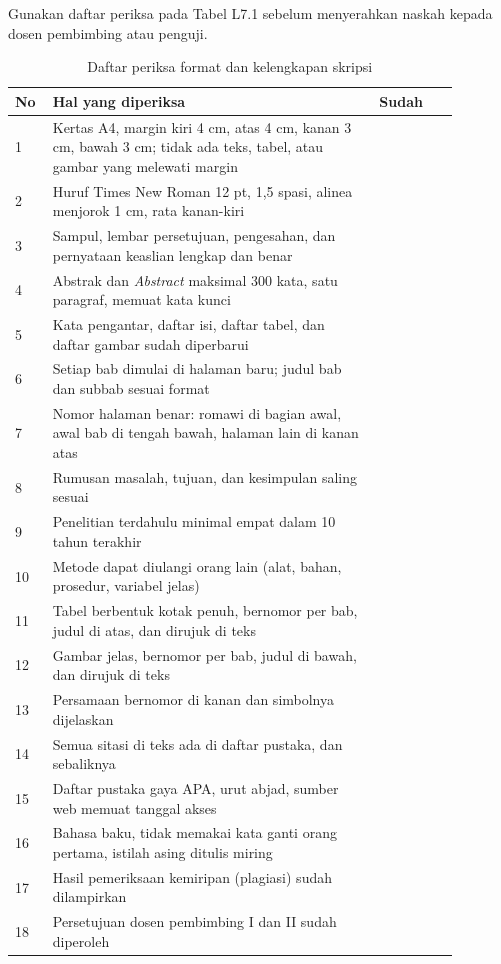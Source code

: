 Gunakan daftar periksa pada Tabel L7.1 sebelum menyerahkan naskah kepada dosen pembimbing atau penguji.

\begin{singlespace}
\begin{longtable}{|p{0.06\linewidth}|p{0.66\linewidth}|p{0.16\linewidth}|}
\caption{Daftar periksa format dan kelengkapan skripsi}\\
\hline
\textbf{No} & \textbf{Hal yang diperiksa} & \textbf{Sudah} \\
\hline
1 & Kertas A4, margin kiri 4 cm, atas 4 cm, kanan 3 cm, bawah 3 cm; tidak ada teks, tabel, atau gambar yang melewati margin & \\
\hline
2 & Huruf Times New Roman 12 pt, 1,5 spasi, alinea menjorok 1 cm, rata kanan-kiri & \\
\hline
3 & Sampul, lembar persetujuan, pengesahan, dan pernyataan keaslian lengkap dan benar & \\
\hline
4 & Abstrak dan \textit{Abstract} maksimal 300 kata, satu paragraf, memuat kata kunci & \\
\hline
5 & Kata pengantar, daftar isi, daftar tabel, dan daftar gambar sudah diperbarui & \\
\hline
6 & Setiap bab dimulai di halaman baru; judul bab dan subbab sesuai format & \\
\hline
7 & Nomor halaman benar: romawi di bagian awal, awal bab di tengah bawah, halaman lain di kanan atas & \\
\hline
8 & Rumusan masalah, tujuan, dan kesimpulan saling sesuai & \\
\hline
9 & Penelitian terdahulu minimal empat dalam 10 tahun terakhir & \\
\hline
10 & Metode dapat diulangi orang lain (alat, bahan, prosedur, variabel jelas) & \\
\hline
11 & Tabel berbentuk kotak penuh, bernomor per bab, judul di atas, dan dirujuk di teks & \\
\hline
12 & Gambar jelas, bernomor per bab, judul di bawah, dan dirujuk di teks & \\
\hline
13 & Persamaan bernomor di kanan dan simbolnya dijelaskan & \\
\hline
14 & Semua sitasi di teks ada di daftar pustaka, dan sebaliknya & \\
\hline
15 & Daftar pustaka gaya APA, urut abjad, sumber web memuat tanggal akses & \\
\hline
16 & Bahasa baku, tidak memakai kata ganti orang pertama, istilah asing ditulis miring & \\
\hline
17 & Hasil pemeriksaan kemiripan (plagiasi) sudah dilampirkan & \\
\hline
18 & Persetujuan dosen pembimbing I dan II sudah diperoleh & \\
\hline
\end{longtable}
\end{singlespace}

